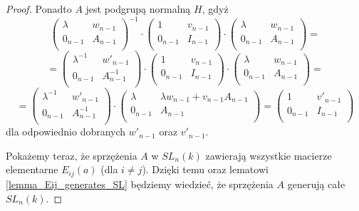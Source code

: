 \documentclass[licencjacka]{pracamgr}
\begin{document}
\begin{proof}
  Ponadto $A$ jest podgrupą normalną $H$, gdyż
  $$
    \left( \begin{array}{cc} \lambda & w_{n-1} \\ 0_{n-1} & A_{n-1} \\ \end{array} \right)^{-1} \cdot
    \left( \begin{array}{cc} 1 & v_{n-1} \\ 0_{n-1} & I_{n-1} \\ \end{array} \right)  \cdot
    \left( \begin{array}{cc} \lambda & w_{n-1} \\ 0_{n-1} & A_{n-1} \\ \end{array} \right) = 
  $$
  $$ = 
    \left( \begin{array}{cc} \lambda^{-1} & w'_{n-1} \\ 0_{n-1} & A^{-1}_{n-1} \\ \end{array} \right) \cdot
    \left( \begin{array}{cc} 1 & v_{n-1} \\ 0_{n-1} & I_{n-1} \\ \end{array} \right)  \cdot
    \left( \begin{array}{cc} \lambda & w_{n-1} \\ 0_{n-1} & A_{n-1} \\ \end{array} \right) = 
  $$
  $$ = 
    \left( \begin{array}{cc} \lambda^{-1} & w'_{n-1} \\ 0_{n-1} & A^{-1}_{n-1} \\ \end{array} \right) \cdot
    \left( \begin{array}{cc} \lambda & \lambda w_{n-1} + v_{n-1}A_{n-1} \\ 0_{n-1} & A_{n-1} \\ \end{array} \right) = 
    \left( \begin{array}{cc} 1 & v'_{n-1} \\ 0_{n-1} & I_{n-1} \\ \end{array} \right)  
  $$
  dla odpowiednio dobranych $w'_{n-1}$ oraz $v'_{n-1}$.

  Pokażemy teraz, że sprzężenia $A$ w $SL_n(k)$ zawierają wszystkie macierze elementarne $E_{i j}(a)$ (dla $i \ne j$).
  Dzięki temu oraz lematowi \ref{lemma_Eij_generates_SL} będziemy wiedzieć, że sprzężenia $A$ generują całe $SL_n(k)$.


\end{proof}
\end{document}
